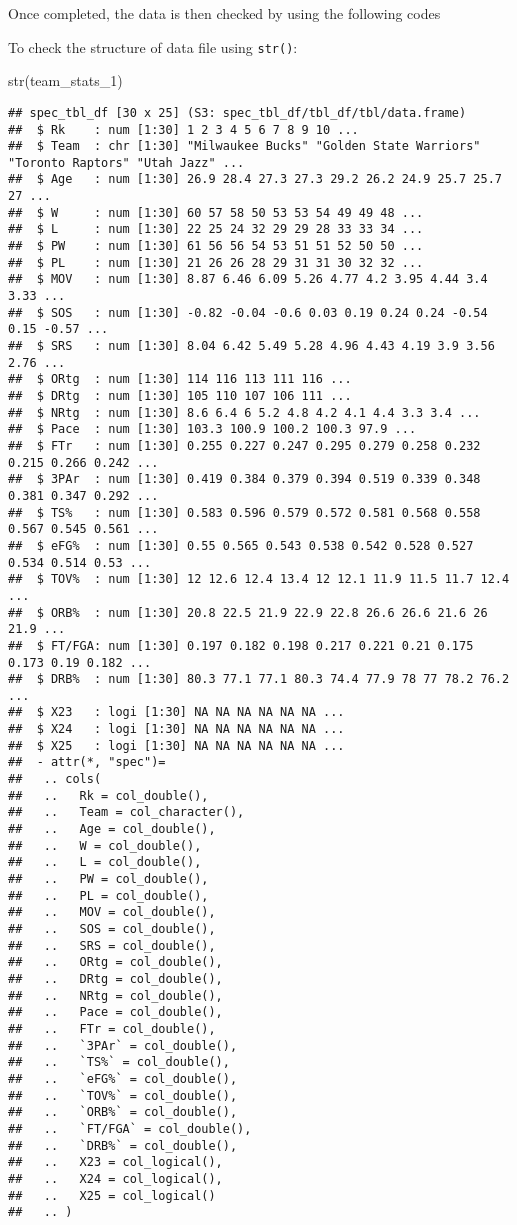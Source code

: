 \documentclass[
]{article}
\newenvironment{Shaded}{\begin{snugshade}}{\end{snugshade}}
\newcommand{\FunctionTok}[1]{\textcolor[rgb]{0.00,0.00,0.00}{#1}}
\newcommand{\NormalTok}[1]{#1}
\begin{document}
Once completed, the data is then checked by using the following codes

To check the structure of data file using \texttt{str()}:

\begin{Shaded}
\begin{Highlighting}[]
\FunctionTok{str}\NormalTok{(team\_stats\_1)}
\end{Highlighting}
\end{Shaded}

\begin{verbatim}
## spec_tbl_df [30 x 25] (S3: spec_tbl_df/tbl_df/tbl/data.frame)
##  $ Rk    : num [1:30] 1 2 3 4 5 6 7 8 9 10 ...
##  $ Team  : chr [1:30] "Milwaukee Bucks" "Golden State Warriors" "Toronto Raptors" "Utah Jazz" ...
##  $ Age   : num [1:30] 26.9 28.4 27.3 27.3 29.2 26.2 24.9 25.7 25.7 27 ...
##  $ W     : num [1:30] 60 57 58 50 53 53 54 49 49 48 ...
##  $ L     : num [1:30] 22 25 24 32 29 29 28 33 33 34 ...
##  $ PW    : num [1:30] 61 56 56 54 53 51 51 52 50 50 ...
##  $ PL    : num [1:30] 21 26 26 28 29 31 31 30 32 32 ...
##  $ MOV   : num [1:30] 8.87 6.46 6.09 5.26 4.77 4.2 3.95 4.44 3.4 3.33 ...
##  $ SOS   : num [1:30] -0.82 -0.04 -0.6 0.03 0.19 0.24 0.24 -0.54 0.15 -0.57 ...
##  $ SRS   : num [1:30] 8.04 6.42 5.49 5.28 4.96 4.43 4.19 3.9 3.56 2.76 ...
##  $ ORtg  : num [1:30] 114 116 113 111 116 ...
##  $ DRtg  : num [1:30] 105 110 107 106 111 ...
##  $ NRtg  : num [1:30] 8.6 6.4 6 5.2 4.8 4.2 4.1 4.4 3.3 3.4 ...
##  $ Pace  : num [1:30] 103.3 100.9 100.2 100.3 97.9 ...
##  $ FTr   : num [1:30] 0.255 0.227 0.247 0.295 0.279 0.258 0.232 0.215 0.266 0.242 ...
##  $ 3PAr  : num [1:30] 0.419 0.384 0.379 0.394 0.519 0.339 0.348 0.381 0.347 0.292 ...
##  $ TS%   : num [1:30] 0.583 0.596 0.579 0.572 0.581 0.568 0.558 0.567 0.545 0.561 ...
##  $ eFG%  : num [1:30] 0.55 0.565 0.543 0.538 0.542 0.528 0.527 0.534 0.514 0.53 ...
##  $ TOV%  : num [1:30] 12 12.6 12.4 13.4 12 12.1 11.9 11.5 11.7 12.4 ...
##  $ ORB%  : num [1:30] 20.8 22.5 21.9 22.9 22.8 26.6 26.6 21.6 26 21.9 ...
##  $ FT/FGA: num [1:30] 0.197 0.182 0.198 0.217 0.221 0.21 0.175 0.173 0.19 0.182 ...
##  $ DRB%  : num [1:30] 80.3 77.1 77.1 80.3 74.4 77.9 78 77 78.2 76.2 ...
##  $ X23   : logi [1:30] NA NA NA NA NA NA ...
##  $ X24   : logi [1:30] NA NA NA NA NA NA ...
##  $ X25   : logi [1:30] NA NA NA NA NA NA ...
##  - attr(*, "spec")=
##   .. cols(
##   ..   Rk = col_double(),
##   ..   Team = col_character(),
##   ..   Age = col_double(),
##   ..   W = col_double(),
##   ..   L = col_double(),
##   ..   PW = col_double(),
##   ..   PL = col_double(),
##   ..   MOV = col_double(),
##   ..   SOS = col_double(),
##   ..   SRS = col_double(),
##   ..   ORtg = col_double(),
##   ..   DRtg = col_double(),
##   ..   NRtg = col_double(),
##   ..   Pace = col_double(),
##   ..   FTr = col_double(),
##   ..   `3PAr` = col_double(),
##   ..   `TS%` = col_double(),
##   ..   `eFG%` = col_double(),
##   ..   `TOV%` = col_double(),
##   ..   `ORB%` = col_double(),
##   ..   `FT/FGA` = col_double(),
##   ..   `DRB%` = col_double(),
##   ..   X23 = col_logical(),
##   ..   X24 = col_logical(),
##   ..   X25 = col_logical()
##   .. )
\end{verbatim}
\end{document}
